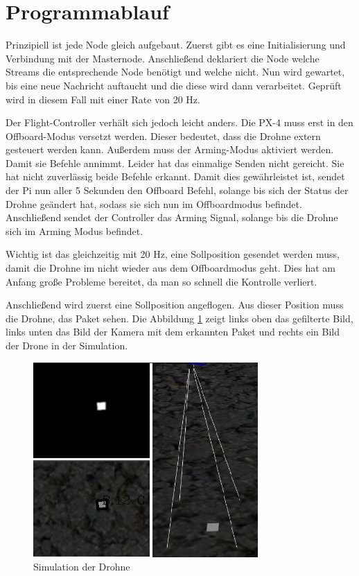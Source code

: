 \section{Programmablauf}
Prinzipiell ist jede Node gleich aufgebaut. Zuerst gibt es eine Initialisierung und Verbindung mit der Masternode. Anschließend deklariert die Node welche Streams die entsprechende Node benötigt und welche nicht. Nun wird gewartet, bis eine neue Nachricht auftaucht und die diese wird dann verarbeitet. Geprüft wird in diesem Fall mit einer Rate von 20 Hz. 

Der Flight-Controller verhält sich jedoch leicht anders. Die PX-4 muss erst in den Offboard-Modus versetzt werden. Dieser bedeutet, dass die Drohne extern gesteuert werden kann. Außerdem muss der Arming-Modus aktiviert werden. Damit sie Befehle annimmt. Leider hat das einmalige Senden nicht gereicht. Sie hat nicht zuverlässig beide Befehle erkannt. Damit dies gewährleistet ist, sendet der Pi nun aller 5 Sekunden den Offboard Befehl, solange bis sich der Status der Drohne geändert hat, sodass sie sich nun im Offboardmodus befindet. Anschließend sendet der Controller das Arming Signal, solange bis die Drohne sich im Arming Modus befindet.

Wichtig ist das gleichzeitig mit 20 Hz, eine Sollposition gesendet werden muss, damit die Drohne im nicht wieder aus dem Offboardmodus geht. Dies hat am Anfang große Probleme bereitet, da man so schnell die Kontrolle verliert.

Anschließend wird zuerst eine Sollposition angeflogen. Aus dieser Position muss die Drohne, das Paket sehen. Die Abbildung \ref{fig:Drone_Simulation1} zeigt links oben das gefilterte Bild, links unten das Bild der Kamera mit dem erkannten Paket und rechts ein Bild der Drone in der Simulation. 
\begin{figure}[h]
	\centering
	\includegraphics[scale=0.8]{"Grafiken/Drone_Gazebossimulatiuon1.png"}
	\caption{Simulation der Drohne}
	\label{fig:Drone_Simulation1}
\end{figure}

